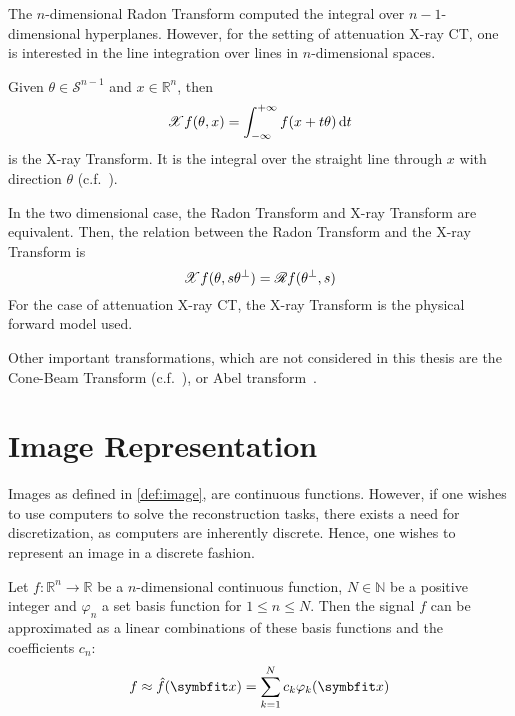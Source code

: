 The \(n\)-dimensional Radon Transform computed the integral over \(n-1\)-dimensional hyperplanes.
However, for the setting of attenuation X-ray CT, one is interested in the line integration over
lines in \(n\)-dimensional spaces.

\begin{definition}
	Given \(\theta \in \mathscr{S}^{n-1}\) and \(x \in \mathbb{R}^n\), then
	\[ \mathscr{X} f(\theta, x) = \int_{-\infty}^{+\infty} f(x + t \theta) \, \mathrm{d}t\]
	is the X-ray Transform. It is the integral over the straight line through \(x\) with
	direction \(\theta\) (c.f.~\cite{natterer_mathematics_1986,solmon_x-ray_1976}).
\end{definition}

In the two dimensional case, the Radon Transform and X-ray Transform are equivalent.
Then, the relation between the Radon Transform and the X-ray Transform is
\[\mathscr{X} f(\theta, s\theta^\perp) = \mathscr{R} f(\theta^\perp, s)\]
For the case of attenuation X-ray CT, the X-ray Transform is the physical forward model used.


Other important transformations, which are not considered in this thesis are the Cone-Beam Transform
(c.f.~\cite[chap 2]{carpio_inverse_2008}), or Abel transform~\cite[Chapter 4.16]{buzug_computed_2008}.

\chapter{Image Representation}\label{chap:image_representation}

Images as defined in \autoref{def:image}, are continuous functions. However, if one wishes to use
computers to solve the reconstruction tasks, there exists a need for discretization, as computers
are inherently discrete. Hence, one wishes to represent an image in a discrete fashion.

\begin{definition}
	\label{def:permissible_representation}
	Let \(f\colon \mathbb{R}^n \to \mathbb{R}\) be a \(n\)-dimensional continuous function,
	\(N \in \mathbb{N}\) be a positive integer and \(\varphi_n\) a set basis function for
	\(1 \leq n \leq N\). Then the signal \(f\) can be approximated as a linear combinations
	of these basis functions and the coefficients \(c_n\):
	\[ f \approx \near{f}(\mvec{x}) = \sum_{k=1}^{N} c_k \varphi_k(\mvec{x}) \]
\end{definition}

